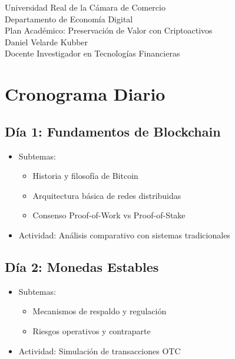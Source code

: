 \documentclass{article}
\begin{document}
\begin{center}
    \vspace*{2cm}
    {\LARGE Universidad Real de la Cámara de Comercio \\ Departamento de Economía Digital}\\
    \vspace{1cm}
    {\Huge Plan Académico: Preservación de Valor con Criptoactivos}\\ 
    \vspace{1cm}
    {\large Daniel Velarde Kubber \\ Docente Investigador en Tecnologías Financieras}
\end{center}

\section{Cronograma Diario}

\subsection*{Día 1: Fundamentos de Blockchain}
\begin{itemize}
    \item Subtemas:
    \begin{itemize}
        \item Historia y filosofía de Bitcoin
        \item Arquitectura básica de redes distribuidas
        \item Consenso Proof-of-Work vs Proof-of-Stake
    \end{itemize}
    \item Actividad: Análisis comparativo con sistemas tradicionales
\end{itemize}

\subsection*{Día 2: Monedas Estables}
\begin{itemize}
    \item Subtemas:
    \begin{itemize}
        \item Mecanismos de respaldo y regulación
        \item Riesgos operativos y contraparte
    \end{itemize}
    \item Actividad: Simulación de transacciones OTC
\end{itemize}
\end{document}
